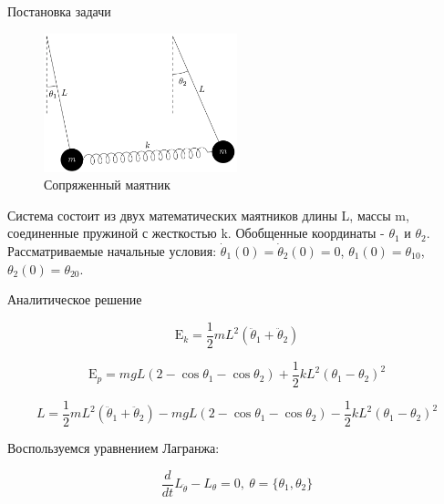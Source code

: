 \documentclass{beamer}
\begin{document}
\begin{frame}{Постановка задачи}

    \begin{figure}
        \centering
        \includegraphics[width = 0.5\textwidth]{images/Pendulum.png}
        \caption{Сопряженный маятник}
        \label{fig:enter-label}
    \end{figure}

    Система состоит из двух математических маятников длины L, массы m, соединенные пружиной с жесткостью k. Обобщенные координаты - $\theta_1$ и $\theta_2$. Рассматриваемые начальные условия: $\dot \theta_1(0) = \dot \theta_2(0) = 0$, $\theta_1(0) = \theta_{10}$, $\theta_2(0) = \theta_{20}$.
    
\end{frame}


\begin{frame}{Аналитическое решение}

    $$\text{E}_k = \frac{1}{2}m L^2 (\ddot \theta_1 + \ddot \theta_2)$$

    $$\text{E}_p = m g L (2 - \cos \theta_1 - \cos \theta_2) + \frac{1}{2} k L^2 (\theta_1 - \theta_2)^2$$

    $$L = \frac{1}{2}m L^2 (\ddot \theta_1 + \ddot \theta_2) - m g L (2 - \cos \theta_1 - \cos \theta_2) - \frac{1}{2} k L^2 (\theta_1 - \theta_2)^2$$

    Воспользуемся уравнением Лагранжа:

    $$\frac{d}{dt} L_{\dot \theta} - L_{\theta} = 0,\ \theta = \{\theta_1, \theta_2\}$$

\end{frame}
\end{document}
